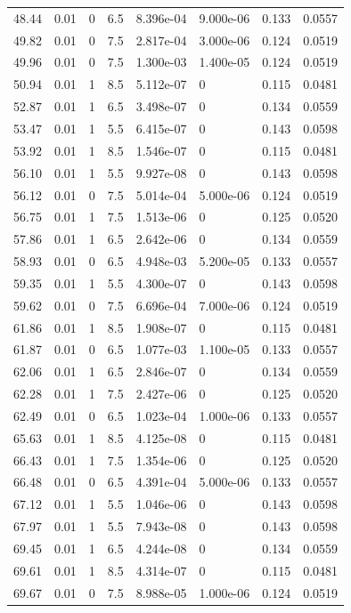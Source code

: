 \documentclass[preview]{standalone}
\begin{document}
{{{\begin{tabular}{L{1.2cm}C{1.2cm} C{0.3cm}C{0.5cm} C{1.4cm}C{1.4cm} C{1.4cm}C{1.4cm}}
  48.44  &  0.01  & 0     & 6.5 &  8.396e-04  & 9.000e-06  & 0.133 &  0.0557   \\ 
  49.82  &  0.01  & 0     & 7.5 &  2.817e-04  & 3.000e-06  & 0.124 &  0.0519   \\ 
  49.96  &  0.01  & 0     & 7.5 &  1.300e-03  & 1.400e-05  & 0.124 &  0.0519   \\ 
  50.94  &  0.01  & 1     & 8.5 &  5.112e-07  & 0  & 0.115 &  0.0481   \\ 
  52.87  &  0.01  & 1     & 6.5 &  3.498e-07  & 0  & 0.134 &  0.0559   \\ 
  53.47  &  0.01  & 1     & 5.5 &  6.415e-07  & 0  & 0.143 &  0.0598   \\ 
  53.92  &  0.01  & 1     & 8.5 &  1.546e-07  & 0  & 0.115 &  0.0481   \\ 
  56.10  &  0.01  & 1     & 5.5 &  9.927e-08  & 0  & 0.143 &  0.0598   \\ 
  56.12  &  0.01  & 0     & 7.5 &  5.014e-04  & 5.000e-06  & 0.124 &  0.0519   \\ 
  56.75  &  0.01  & 1     & 7.5 &  1.513e-06  & 0  & 0.125 &  0.0520   \\ 
  57.86  &  0.01  & 1     & 6.5 &  2.642e-06  & 0  & 0.134 &  0.0559   \\ 
  58.93  &  0.01  & 0     & 6.5 &  4.948e-03  & 5.200e-05  & 0.133 &  0.0557   \\ 
  59.35  &  0.01  & 1     & 5.5 &  4.300e-07  & 0  & 0.143 &  0.0598   \\ 
  59.62  &  0.01  & 0     & 7.5 &  6.696e-04  & 7.000e-06  & 0.124 &  0.0519   \\ 
  61.86  &  0.01  & 1     & 8.5 &  1.908e-07  & 0  & 0.115 &  0.0481   \\ 
  61.87  &  0.01  & 0     & 6.5 &  1.077e-03  & 1.100e-05  & 0.133 &  0.0557   \\ 
  62.06  &  0.01  & 1     & 6.5 &  2.846e-07  & 0  & 0.134 &  0.0559   \\ 
  62.28  &  0.01  & 1     & 7.5 &  2.427e-06  & 0  & 0.125 &  0.0520   \\ 
  62.49  &  0.01  & 0     & 6.5 &  1.023e-04  & 1.000e-06  & 0.133 &  0.0557   \\ 
  65.63  &  0.01  & 1     & 8.5 &  4.125e-08  & 0  & 0.115 &  0.0481   \\ 
  66.43  &  0.01  & 1     & 7.5 &  1.354e-06  & 0  & 0.125 &  0.0520   \\ 
  66.48  &  0.01  & 0     & 6.5 &  4.391e-04  & 5.000e-06  & 0.133 &  0.0557   \\ 
  67.12  &  0.01  & 1     & 5.5 &  1.046e-06  & 0  & 0.143 &  0.0598   \\ 
  67.97  &  0.01  & 1     & 5.5 &  7.943e-08  & 0  & 0.143 &  0.0598   \\ 
  69.45  &  0.01  & 1     & 6.5 &  4.244e-08  & 0  & 0.134 &  0.0559   \\ 
  69.61  &  0.01  & 1     & 8.5 &  4.314e-07  & 0  & 0.115 &  0.0481   \\ 
  69.67  &  0.01  & 0     & 7.5 &  8.988e-05  & 1.000e-06  & 0.124 &  0.0519   \\ 
\hline 
\end{tabular} 

}}}
\end{document}
